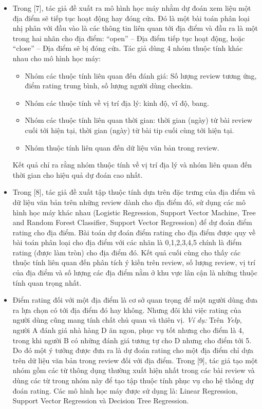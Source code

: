 \documentclass[12pt]{extarticle}
\begin{document}
			\begin{itemize}
				\item Trong [7], tác giả đề xuất ra mô hình học máy nhằm dự đoán xem liệu một địa điểm sẽ tiếp tục hoạt động hay đóng cửa. Đó là một bài toán phân loại nhị phân với đầu vào là các thông tin liên quan tới địa điểm và đầu ra là một trong hai nhãn cho địa điểm: “open” – Địa điểm tiếp tục hoạt động, hoặc “close” – Địa điểm sẽ bị đóng cửa. Tác giả dùng 4 nhóm thuộc tính khác nhau cho mô hình học máy:
					\begin{itemize}
						\item Nhóm các thuộc tính liên quan đến đánh giá: Số lượng review tương ứng, điểm rating trung bình, số lượng người dùng checkin.
						\item Nhóm các thuộc tính về vị trí địa lý: kinh độ, vĩ độ, bang.
						\item Nhóm các thuộc tính liên quan thời gian: thời gian (ngày) từ bài review cuối tới hiện tại, thời gian (ngày) từ bài tip cuối cùng tới hiện tại.
						\item Nhóm thuộc tính liên quan đến dữ liệu văn bản trong review.
					\end{itemize}
					Kết quả chỉ ra rằng nhóm thuộc tính về vị trí địa lý và nhóm liên quan đến thời gian cho hiệu quả dự đoán cao nhất.
				\item Trong [8], tác giả đề xuất tập thuộc tính dựa trên đặc trưng của địa điểm và dữ liệu văn bản trên những review dành cho địa điểm đó, sử dụng các mô hình học máy khác nhau (Logistic Regression, Support Vector Machine, Tree and Random Forest Classifier, Support Vector Regression) để dự đoán điểm rating cho địa điểm. Bài toán dự đoán điểm rating cho địa điểm được quy về bài toán phân loại cho địa điểm với các nhãn là 0,1,2,3,4,5 chính là điểm rating (được làm tròn) cho địa điểm đó. Kết quả cuối cùng cho thấy các thuộc tính liên quan đến phân tích ý kiến trên review, số lượng review, vị trí của địa điểm và số lượng các địa điểm nằm ở khu vực lân cận là những thuộc tính quan trọng nhất.
				\item Điểm rating đối với một địa điểm là cơ sở quan trọng để một người dùng đưa ra lựa chọn có tới địa điểm đó hay không. Nhưng đôi khi việc rating của người dùng cũng mang tính chất chủ quan và thiên vị. \textit{Ví dụ:} Trên \textit{Yelp}, người A đánh giá nhà hàng D ăn ngon, phục vụ tốt nhưng cho điểm là 4, trong khi người B có những đánh giá tương tự cho D nhưng cho điểm tới 5. Do đó một ý tưởng được đưa ra là dự đoán rating cho một địa điểm chỉ dựa trên dữ liệu văn bản trong review đối với địa điểm. Trong [9], tác giả tạo một nhóm gồm các từ thông dụng thường xuất hiện nhất trong các bài review và dùng các từ trong nhóm này để tạo tập thuộc tính phục vụ cho hệ thống dự đoán rating. Các mô hình học máy được sử dụng là: Linear Regression, Support Vector Regression và Decision Tree Regression.

\end{itemize}
\end{document}
